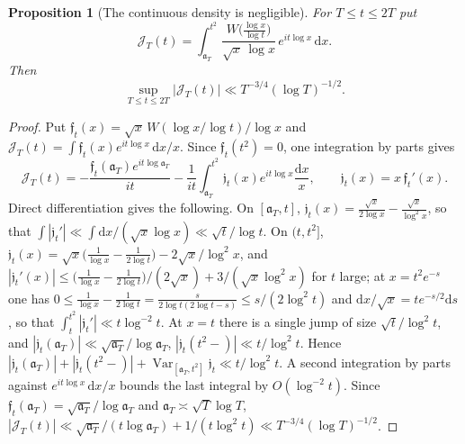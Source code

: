 \documentclass[11pt,a4paper]{article}
\numberwithin{equation}{section}
\newtheorem{proposition}[theorem]{Proposition}
\theoremstyle{definition}
\theoremstyle{remark}
\begin{document}
\begin{proposition}[The continuous density is negligible]\label{prop:taucw-cont}
For $T\le t\le2T$ put
\begin{equation}\label{eq:taucw-cont}
\mathscr J_T(t)=\int_{\mathfrak a_T}^{t^2}\frac{W\bigl(\frac{\log x}{\log t}\bigr)}{\sqrt x\,\log x}\,e^{it\log x}\,\mathrm dx .
\end{equation}
Then
\begin{equation}\label{eq:taucw-cont-bound}
\sup_{T\le t\le2T}\bigl|\mathscr J_T(t)\bigr|\ll T^{-3/4}(\log T)^{-1/2}.
\end{equation}
\end{proposition}
\begin{proof}
Put $\mathfrak f_t(x)=\sqrt x\,W(\log x/\log t)/\log x$ and $\mathscr J_T(t)=\int\mathfrak f_t(x)e^{it\log x}\,\mathrm dx/x$. Since $\mathfrak f_t(t^2)=0$, one integration by parts gives
\begin{equation}
\mathscr J_T(t)=-\frac{\mathfrak f_t(\mathfrak a_T)e^{it\log\mathfrak a_T}}{it}-\frac1{it}\int_{\mathfrak a_T}^{t^2}\mathfrak j_t(x)e^{it\log x}\frac{\mathrm dx}x,\qquad \mathfrak j_t(x)=x\,\mathfrak f_t'(x).
\end{equation}
Direct differentiation gives the following. On $[\mathfrak a_T,t]$, $\mathfrak j_t(x)=\frac{\sqrt x}{2\log x}-\frac{\sqrt x}{\log^2x}$, so that $\int|\mathfrak j_t'|\ll\int\mathrm dx/(\sqrt x\log x)\ll\sqrt t/\log t$. On $(t,t^2]$, $\mathfrak j_t(x)=\sqrt x\bigl(\frac1{\log x}-\frac1{2\log t}\bigr)-2\sqrt x/\log^2x$, and $|\mathfrak j_t'(x)|\le\bigl(\frac1{\log x}-\frac1{2\log t}\bigr)/(2\sqrt x)+3/(\sqrt x\log^2x)$ for $t$ large; at $x=t^2e^{-s}$ one has $0\le\frac1{\log x}-\frac1{2\log t}=\frac s{2\log t(2\log t-s)}\le s/(2\log^2t)$ and $\mathrm dx/\sqrt x=te^{-s/2}\mathrm ds$, so that $\int_t^{t^2}|\mathfrak j_t'|\ll t\log^{-2}t$. At $x=t$ there is a single jump of size $\sqrt t/\log^2t$, and $|\mathfrak j_t(\mathfrak a_T)|\ll\sqrt{\mathfrak a_T}/\log\mathfrak a_T$, $|\mathfrak j_t(t^2-)|\ll t/\log^2t$. Hence $|\mathfrak j_t(\mathfrak a_T)|+|\mathfrak j_t(t^2-)|+\operatorname{Var}_{[\mathfrak a_T,t^2]}\mathfrak j_t\ll t/\log^2t$. A second integration by parts against $e^{it\log x}\,\mathrm dx/x$ bounds the last integral by $O(\log^{-2}t)$. Since $\mathfrak f_t(\mathfrak a_T)=\sqrt{\mathfrak a_T}/\log\mathfrak a_T$ and $\mathfrak a_T\asymp\sqrt T\log T$, $|\mathscr J_T(t)|\ll\sqrt{\mathfrak a_T}/(t\log\mathfrak a_T)+1/(t\log^2t)\ll T^{-3/4}(\log T)^{-1/2}$.
\end{proof}
\end{document}
